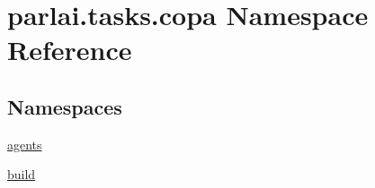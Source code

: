 \hypertarget{namespaceparlai_1_1tasks_1_1copa}{}\section{parlai.\+tasks.\+copa Namespace Reference}
\label{namespaceparlai_1_1tasks_1_1copa}
\subsection*{Namespaces}
\begin{DoxyCompactItemize}
\item 
 \hyperlink{namespaceparlai_1_1tasks_1_1copa_1_1agents}{agents}
\item 
 \hyperlink{namespaceparlai_1_1tasks_1_1copa_1_1build}{build}
\end{DoxyCompactItemize}
